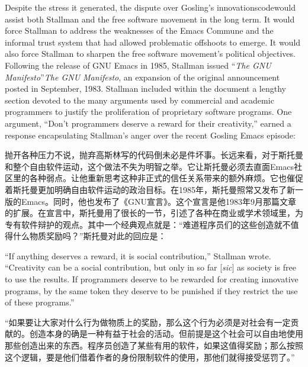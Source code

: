 \ifdefined\eng
Despite the stress it generated, the dispute over Gosling's \ifdefined\vone innovations\fi\ifdefined\vtwo code\fi would assist both Stallman and the free software movement in the long term. It would force Stallman to address the weaknesses of the Emacs Commune and the informal trust system that had allowed problematic offshoots to emerge. It would also force Stallman to sharpen the free software movement's political objectives. Following the release of GNU Emacs in 1985, Stallman issued \ifdefined\vone ``\textit{The GNU Manifesto}''\fi\ifdefined\vtwo \textit{The GNU Manifesto}\fi, an expansion of the original announcement posted in September, 1983. Stallman included within the document a lengthy section devoted to the many arguments used by commercial and academic programmers to justify the proliferation of proprietary software programs. One argument, ``Don't programmers deserve a reward for their creativity,'' earned a response encapsulating Stallman's anger over the recent Gosling Emacs episode:
\fi

\ifdefined\chs
抛开各种压力不说，抛弃高斯林写的代码倒未必是件坏事。长远来看，对于斯托曼和整个自由软件运动，这个做法不失为明智之举。它让斯托曼必须去直面Emacs社区里的各种弱点。让他重新思考这种非正式的信任关系带来的额外麻烦。它也催促着斯托曼更加明确自由软件运动的政治目标。在1985年，斯托曼照常又发布了新一版的Emacs。同时，他也发布了《GNU宣言》。这个宣言是他1983年9月那篇文章的扩展。在宣言中，斯托曼用了很长的一节，引述了各种在商业或学术领域里，为专有软件辩护的观点。其中一个经典观点就是：``难道程序员们的这些创造就不值得什么物质奖励吗？''斯托曼对此的回应是：
\fi

\ifdefined\eng
``If anything deserves a reward, it is social contribution,'' Stallman wrote. ``Creativity can be a social contribution, but only in so far [\textit{sic}] as society is free to use the results. If programmers deserve to be rewarded for creating innovative programs, by the same token they deserve to be punished if they restrict the use of these programs.''
\fi

\ifdefined\chs
``如果要让大家对什么行为做物质上的奖励，那么这个行为必须是对社会有一定贡献的。创造本身的确是一种有益于社会的活动。但前提是这个社会可以自由地使用那些创造出来的东西。程序员创造了某些有用的软件，如果这值得奖励；那么按照这个逻辑，要是他们借着作者的身份限制软件的使用，那他们就得接受惩罚了。''
\fi

